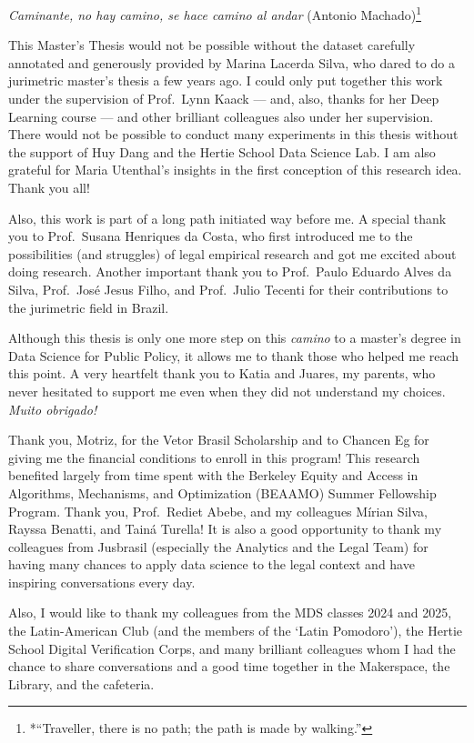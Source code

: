 \documentclass[
  12pt,
]{article}
\begin{document}
\emph{Caminante, no hay camino, se hace camino al andar} (Antonio
Machado)\footnote{*``Traveller, there is no path; the path is made by
  walking.''}

This Master's Thesis would not be possible without the dataset carefully
annotated and generously provided by Marina Lacerda Silva, who dared to
do a jurimetric master's thesis a few years ago. I could only put
together this work under the supervision of Prof.~Lynn Kaack --- and,
also, thanks for her Deep Learning course --- and other brilliant
colleagues also under her supervision. There would not be possible to
conduct many experiments in this thesis without the support of Huy Dang
and the Hertie School Data Science Lab. I am also grateful for Maria
Utenthal's insights in the first conception of this research idea. Thank
you all!

Also, this work is part of a long path initiated way before me. A
special thank you to Prof.~Susana Henriques da Costa, who first
introduced me to the possibilities (and struggles) of legal empirical
research and got me excited about doing research. Another important
thank you to Prof.~Paulo Eduardo Alves da Silva, Prof.~José Jesus Filho,
and Prof.~Julio Tecenti for their contributions to the jurimetric field
in Brazil.

Although this thesis is only one more step on this \emph{camino} to a
master's degree in Data Science for Public Policy, it allows me to thank
those who helped me reach this point. A very heartfelt thank you to
Katia and Juares, my parents, who never hesitated to support me even
when they did not understand my choices. \emph{Muito obrigado!}

Thank you, Motriz, for the Vetor Brasil Scholarship and to Chancen Eg
for giving me the financial conditions to enroll in this program! This
research benefited largely from time spent with the Berkeley Equity and
Access in Algorithms, Mechanisms, and Optimization (BEAAMO) Summer
Fellowship Program. Thank you, Prof.~Rediet Abebe, and my colleagues
Mírian Silva, Rayssa Benatti, and Tainá Turella! It is also a good
opportunity to thank my colleagues from Jusbrasil (especially the
Analytics and the Legal Team) for having many chances to apply data
science to the legal context and have inspiring conversations every day.

Also, I would like to thank my colleagues from the MDS classes 2024 and
2025, the Latin-American Club (and the members of the `Latin Pomodoro'),
the Hertie School Digital Verification Corps, and many brilliant
colleagues whom I had the chance to share conversations and a good time
together in the Makerspace, the Library, and the cafeteria.
\end{document}
